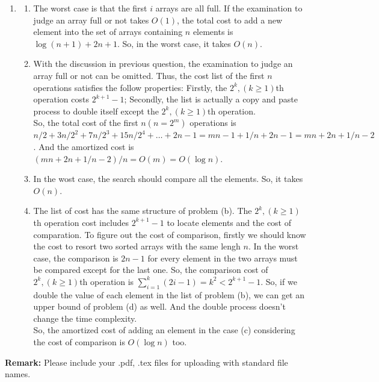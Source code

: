 \documentclass[12pt,a4paper]{article}
\makeatletter
\newtheorem*{solution}{Solution}
\theoremstyle{definition}
\renewenvironment{solution}[1][Solution] {\par\pushQED{\qed}\normalfont\topsep6\p@\@plus6\p@\relax\trivlist\item[\hskip\labelsep\bfseries#1\@addpunct{.}]\ignorespaces}{\popQED\endtrivlist\@endpefalse} \makeatother
\makeatother
\begin{document}
\begin{enumerate}
	\begin{solution}
		\begin{enumerate}
			\item The worst case is that the first $i$ arrays are all full. If the examination to judge an array full or not takes $O(1)$, the total cost to add a new element into the set of arrays containing $n$ elements is $\log (n+1)+2n+1$. So, in the worst case, it takes $O(n)$.
			\item With the discussion in previous question, the examination to judge an array full or not can be omitted. Thus, the cost list of the first $n$ operations satisfies the follow properties: Firstly, the $2^k,(k\geqslant 1)$th operation costs $2^{k+1}-1$; Secondly, the list is actually a copy and paste process to double itself except the $2^k,(k\geqslant 1)$th operation. 
			\\ So, the total cost of the first $n(n=2^m)$ operations is $n/2+3n/2^2+7n/2^3+15n/2^4+\ldots+2n-1=mn-1+1/n+2n-1=mn+2n+1/n-2$. And the amortized cost is $(mn+2n+1/n-2)/n=O(m)=O(\log n)$.
			\item In the wost case, the search should compare all the elements. So, it takes $O(n)$.
			\item The list of cost has the same structure of problem (b). The $2^k,(k\geqslant 1)$th operation cost includes $2^{k+1}-1$ to locate elements and the cost of comparation. To figure out the cost of comparison, firstly we should know the cost to resort two sorted arrays with the same lengh $n$. In the worst case, the comparison is $2n-1$ for every element in the two arrays must be compared except for the last one.
			So, the comparison cost of $2^k,(k\geqslant 1)$th operation is $\sum_{i = 1}^{k} (2i-1) = k^2<2^{k+1}-1$. So, if we double the value of each element in the list of problem (b), we can get an upper bound of problem (d) as well. And the double process doesn't change the time complexity.
			\\ So, the amortized cost of adding an element in the case (c) considering the cost of comparison is $O(\log n)$ too.
	    \end{enumerate}
	\end{solution} 
	
\end{enumerate}



\textbf{Remark:} Please include your .pdf, .tex files for uploading with standard file names.


\end{document}
